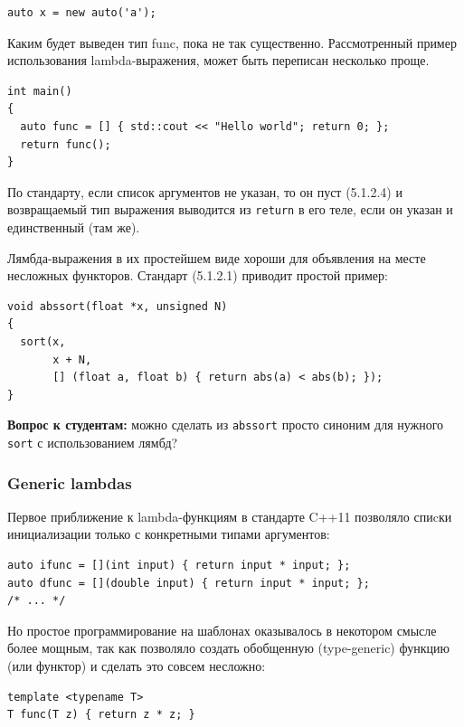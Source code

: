 \documentclass[a4paper,12pt,oneside]{article}
\newif\ifanswers
\begin{document}
\begin{lstlisting}
auto x = new auto('a');
\end{lstlisting}

Каким будет выведен тип func, пока не так существенно. Рассмотренный пример использования lambda-выражения, может быть переписан несколько проще.

\begin{lstlisting}
int main()
{
  auto func = [] { std::cout << "Hello world"; return 0; };
  return func(); 
}
\end{lstlisting}

По стандарту, если список аргументов не указан, то он пуст (5.1.2.4) и возвращаемый тип выражения выводится из \lstinline!return! в его теле, если он указан и единственный (там же).

Лямбда-выражения в их простейшем виде хороши для объявления на месте несложных функторов. Стандарт (5.1.2.1) приводит простой пример:

\begin{lstlisting}
void abssort(float *x, unsigned N)
{
  sort(x, 
       x + N,
       [] (float a, float b) { return abs(a) < abs(b); });
}
\end{lstlisting}

\textbf{Вопрос к студентам:} можно сделать из \lstinline!abssort! просто синоним для нужного \lstinline!sort! с использованием лямбд?

\ifanswers
Правильный ответ: конечно и несложно \lstinline!auto abssort = [] (float *x, unsigned N) { /* ... */ }! тело то же самое
\fi

\subsubsection{Generic lambdas}\label{GenericLambdas}

Первое приближение к lambda-функциям в стандарте C++11 позволяло спиcки инициализации только с конкретными типами аргументов:

\begin{lstlisting}
auto ifunc = [](int input) { return input * input; };
auto dfunc = [](double input) { return input * input; };
/* ... */
\end{lstlisting}

Но простое программирование на шаблонах оказывалось в некотором смысле более мощным, так как позволяло создать обобщенную (type-generic) функцию (или функтор) и сделать это совсем несложно:

\begin{lstlisting}
template <typename T>
T func(T z) { return z * z; }
\end{lstlisting}
\end{document}
